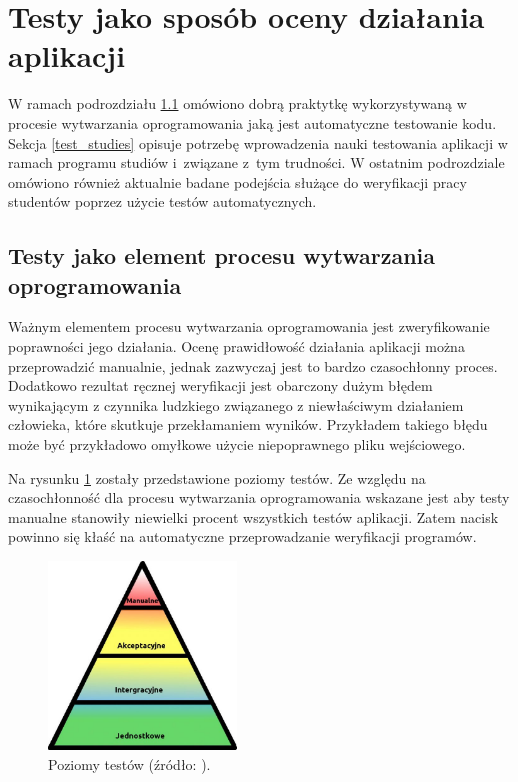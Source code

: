 \vfill

\section{Testy jako sposób oceny działania aplikacji}
\label{programs-testing}

W ramach podrozdziału \ref{test_practices} omówiono dobrą praktytkę wykorzystywaną w procesie wytwarzania oprogramowania jaką jest automatyczne testowanie kodu.
Sekcja \ref{test_studies} opisuje potrzebę wprowadzenia nauki testowania aplikacji w ramach programu studiów i~związane z~tym trudności.
W ostatnim podrozdziale omówiono również aktualnie badane podejścia służące do weryfikacji pracy studentów poprzez użycie testów automatycznych.

\subsection{Testy jako element procesu wytwarzania oprogramowania}
\label{test_practices}

Ważnym elementem procesu wytwarzania oprogramowania jest zweryfikowanie poprawności jego działania.
Ocenę prawidłowość działania aplikacji można przeprowadzić manualnie, jednak zazwyczaj jest to bardzo czasochłonny proces.
Dodatkowo rezultat ręcznej weryfikacji jest obarczony dużym błędem wynikającym z czynnika ludzkiego związanego z niewłaściwym działaniem człowieka, które skutkuje przekłamaniem wyników.
Przykładem takiego błędu może być przykładowo omyłkowe użycie niepoprawnego pliku wejściowego.

Na rysunku \ref{fig:tests-levels} zostały przedstawione poziomy testów.
Ze względu na czasochłonność dla procesu wytwarzania oprogramowania wskazane jest aby testy manualne stanowiły niewielki procent wszystkich testów aplikacji.
Zatem nacisk powinno się kłaść na automatyczne przeprowadzanie weryfikacji programów.

\begin{figure}[h]
    \centering
    \includegraphics[width = 5cm]{chapter02/tests_levels.jpg}
    \caption{Poziomy testów (źródło: \cite{tests-levels}).}
    \label{fig:tests-levels}
\end{figure}

